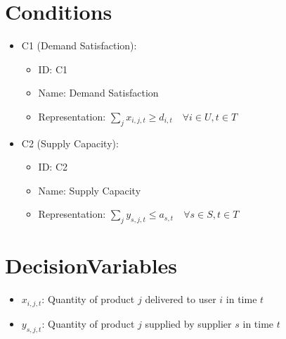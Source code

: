 \documentclass{article}
\begin{document}
\section{Conditions}
\begin{itemize}
    \item C1 (Demand Satisfaction): 
    \begin{itemize}
        \item ID: C1
        \item Name: Demand Satisfaction
        \item Representation: $\sum_{j} x_{i,j,t} \geq d_{i,t} \quad \forall i \in U, t \in T$
    \end{itemize}
    \item C2 (Supply Capacity): 
    \begin{itemize}
        \item ID: C2
        \item Name: Supply Capacity
        \item Representation: $\sum_{j} y_{s,j,t} \leq a_{s,t} \quad \forall s \in S, t \in T$
    \end{itemize}
\end{itemize}

\section{DecisionVariables}
\begin{itemize}
    \item $x_{i,j,t}$: Quantity of product $j$ delivered to user $i$ in time $t$
    \item $y_{s,j,t}$: Quantity of product $j$ supplied by supplier $s$ in time $t$
\end{itemize}
\end{document}

